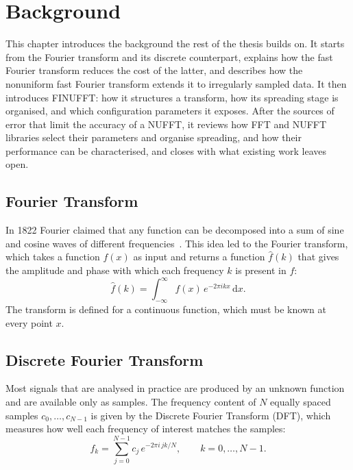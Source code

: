 \chapter{Background}
\label{ch:background}

This chapter introduces the background the rest of the thesis builds on. It
starts from the Fourier transform and its discrete counterpart, explains how
the fast Fourier transform reduces the cost of the latter, and describes how
the nonuniform fast Fourier transform extends it to irregularly sampled data.
It then introduces FINUFFT: how it structures a transform, how its spreading
stage is organised, and which configuration parameters it exposes. After the
sources of error that limit the accuracy of a NUFFT, it reviews how FFT and NUFFT
libraries select their parameters and organise spreading, and how their
performance can be characterised, and closes with what existing work leaves
open.

\section{Fourier Transform}
\label{sec:ft}

In 1822 Fourier claimed that any function can be decomposed into a sum of
sine and cosine waves of different frequencies~\cite{fourier1822}. This idea
led to the Fourier transform, which takes a function $f(x)$ as input and
returns a function $\hat{f}(k)$ that gives the amplitude and phase with which
each frequency $k$ is present in $f$:
\begin{equation}
    \hat{f}(k) = \int_{-\infty}^{\infty} f(x)\, e^{-2\pi i k x}\, \mathrm{d}x.
    \label{eq:ft}
\end{equation}
The transform is defined for a continuous function, which must be known at
every point $x$.

\section{Discrete Fourier Transform}
\label{sec:dft}

Most signals that are analysed in practice are produced by an unknown function
and are available only as samples. The frequency content of $N$ equally spaced
samples $c_0, \dots, c_{N-1}$ is given by the Discrete Fourier Transform (DFT),
which measures how well each frequency of interest matches the samples:
\begin{equation}
    f_k = \sum_{j=0}^{N-1} c_j\, e^{-2\pi i\, jk/N}, \qquad k = 0, \dots, N-1.
    \label{eq:dft}
\end{equation}

